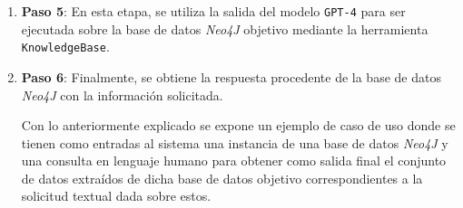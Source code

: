 \begin{enumerate}
\item \textbf{Paso 5}: En esta etapa, se utiliza la salida del modelo \texttt{GPT-4} para ser ejecutada sobre la base de datos \textit{Neo4J} objetivo mediante la herramienta \texttt{KnowledgeBase}.

\item \textbf{Paso 6}: Finalmente, se obtiene la respuesta procedente de la base de datos \textit{Neo4J} con la información solicitada.

Con lo anteriormente explicado se expone un ejemplo de caso de uso donde se tienen como entradas al sistema una instancia de una base de datos \textit{Neo4J} y una consulta en lenguaje humano para obtener como salida final el conjunto de datos extraídos de dicha base de datos objetivo correspondientes a la solicitud textual dada sobre estos.

\end{enumerate}
